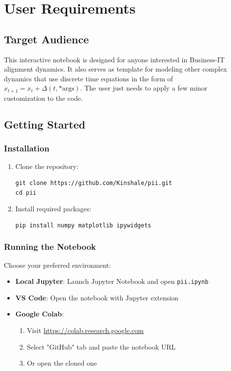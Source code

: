 \documentclass[a4paper, 10pt]{article}
\begin{document}
\section{User Requirements}
\subsection{Target Audience}
This interactive notebook is designed for anyone interested in Business-IT alignment dynamics.
It also serves as template for modeling other complex dynamics that use discrete time equations in the form of $x_{t+1} = x_t + \Delta(t, \text{*args})$. The user just needs to apply a few minor customization to the code.

\subsection{Getting Started}
\subsubsection{Installation}
\begin{enumerate}
    \item Clone the repository:
    \begin{lstlisting}[style=bashstyle]
git clone https://github.com/Kinshale/pii.git
cd pii
    \end{lstlisting}

    \item Install required packages:
    \begin{lstlisting}[style=bashstyle]
pip install numpy matplotlib ipywidgets
    \end{lstlisting}
\end{enumerate}

\subsubsection{Running the Notebook}
Choose your preferred environment:
\begin{itemize}
	\item \textbf{Local Jupyter}: Launch Jupyter Notebook and open \texttt{pii.ipynb}
	\item \textbf{VS Code}: Open the notebook with Jupyter extension
	\item \textbf{Google Colab}:
	      \begin{enumerate}
		      \item Visit \url{https://colab.research.google.com}
		      \item Select "GitHub" tab and paste the notebook URL
		      \item Or open the cloned one
	      \end{enumerate}
\end{itemize}
\end{document}
